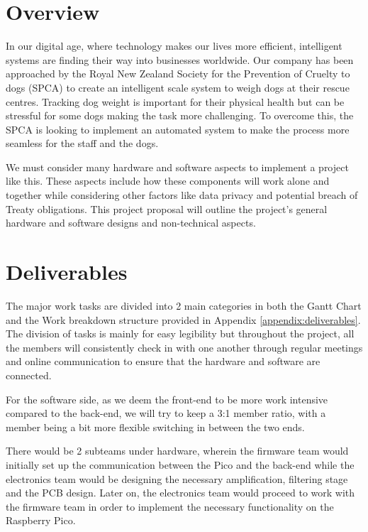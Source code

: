 
\chapter{Overview}

In our digital age, where technology makes our lives more efficient, intelligent systems are finding their way into businesses worldwide. Our company has been approached by the Royal New Zealand Society for the Prevention of Cruelty to dogs (SPCA) to create an intelligent scale system to weigh dogs at their rescue centres. Tracking dog weight is important for their physical health but can be stressful for some dogs making the task more challenging. To overcome this, the SPCA is looking to implement an automated system to make the process more seamless for the staff and the dogs.

We must consider many hardware and software aspects to implement a project like this. These aspects include how these components will work alone and together while considering other factors like data privacy and potential breach of Treaty obligations. This project proposal will outline the project's general hardware and software designs and non-technical aspects.

\chapter{Deliverables}

The major work tasks are divided into 2 main categories in both the Gantt Chart and the Work breakdown structure provided in Appendix \ref{appendix:deliverables}. The division of tasks is mainly for easy legibility but throughout the project, all the members will consistently check in with one another through regular meetings and online communication to ensure that the hardware and software are connected.

For the software side, as we deem the front-end to be more work intensive compared to the back-end, we will try to keep a 3:1 member ratio, with a member being a bit more flexible switching in between the two ends.

There would be 2 subteams under hardware, wherein the firmware team would initially set up the communication between the Pico and the back-end while the electronics team would be designing the necessary amplification, filtering stage and the PCB design. Later on, the electronics team would proceed to work with the firmware team in order to implement the necessary functionality on the Raspberry Pico.

